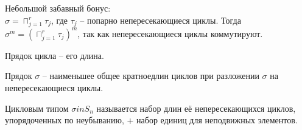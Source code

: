 Небольшой забавный бонус:\\
$\sigma = \sqcap_{j = 1}^r \tau_j$, где $\tau_j$ -- попарно непересекающиеся циклы. Тогда $\sigma^m = (\sqcap_{j = 1}^r \tau_j)^m$, так как непересекающиеся циклы коммутируют.\\
\begin{Def}
Прядок цикла -- его длина.
\end{Def}
\begin{Def}
Прядок $\sigma$ -- наименьшее общее кратноедлин циклов при разложении $\sigma$ на непересекающиеся циклы.
\end{Def}
\begin{Def}
Цикловым типом $\sigma in S_n$ называется набор длин её непересекающихся циклов, упорядоченных по неубыванию, + набор единиц для неподвижных элементов.
\end{Def}